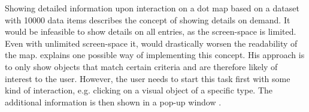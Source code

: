 Showing detailed information upon interaction on a dot map based on a dataset with 10000 data items describes the concept of showing details on demand. It would be infeasible to show details on all entries, as the screen-space is limited. Even with unlimited screen-space it, would drastically worsen the readability of the map. \citeauthor{Ahlberg:1996} explains one possible way of implementing this concept. His approach is to only show objects that match certain criteria and are therefore likely of interest to the user. However, the user needs to start this task first with some kind of interaction, e.g. clicking on a visual object of a specific type. The additional information is then shown in a pop-up window .

